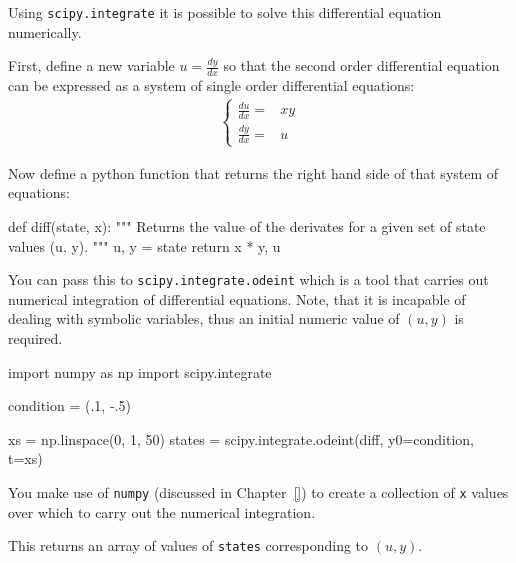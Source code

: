 Using \texttt{scipy.integrate} it is possible to solve this differential equation numerically.


First, define a new variable \(u=\frac{dy}{dx}\) so that the second order
differential equation can be expressed as a system of single order differential
equations:
\begin{equation*}
\begin{split}
    \begin{cases}
        \frac{du}{dx}=&xy\\
        \frac{dy}{dx}=&u
    \end{cases}
\end{split}
\end{equation*}

Now define a python function that returns the right hand side of that
system of equations:




\begin{pyin}
def diff(state, x):
    """
    Returns the value of the derivates for a given set of state values (u, y).
    """
    u, y = state
    return x * y, u
\end{pyin}





You can pass this to \texttt{scipy.integrate.odeint} which is a tool that carries out
numerical integration of differential equations. Note, that it is incapable of
dealing with symbolic variables, thus an initial numeric value of \((u, y)\) is
required.




\begin{pyin}
import numpy as np
import scipy.integrate

condition = (.1, -.5)

xs = np.linspace(0, 1, 50)
states = scipy.integrate.odeint(diff, y0=condition, t=xs)

\end{pyin}






\begin{note}
You make use of
\texttt{numpy} (discussed in Chapter~\ref{}) to create a collection
of \texttt{x} values over which to carry out the numerical integration.
\end{note}



This returns an array of values of \texttt{states} corresponding to \((u, y)\).





